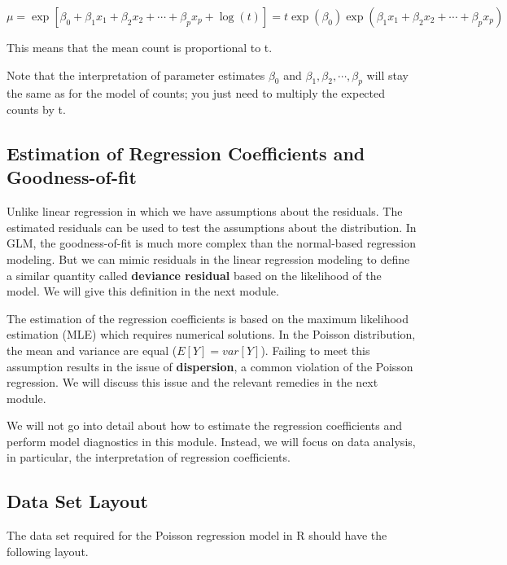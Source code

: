 \documentclass[
]{book}
\begin{document}
\[
\mu=\exp[\beta_0 + \beta_1 x_1 + \beta_2 x_2 + \cdots + \beta_p x_p+\log(t)]
= t\exp(\beta_0)\exp(\beta_1 x_1 + \beta_2 x_2 + \cdots + \beta_p x_p)
\]

This means that the mean count is proportional to t.

Note that the interpretation of parameter estimates \(\beta_0\) and \(\beta_1, \beta_2, \cdots, \beta_p\) will stay the same as for the model of counts; you just need to multiply the expected counts by t.

\hypertarget{estimation-of-regression-coefficients-and-goodness-of-fit}{%
\subsection{Estimation of Regression Coefficients and Goodness-of-fit}\label{estimation-of-regression-coefficients-and-goodness-of-fit}}

Unlike linear regression in which we have assumptions about the residuals. The estimated residuals can be used to test the assumptions about the distribution. In GLM, the goodness-of-fit is much more complex than the normal-based regression modeling. But we can mimic residuals in the linear regression modeling to define a similar quantity called \textbf{deviance residual} based on the likelihood of the model. We will give this definition in the next module.

The estimation of the regression coefficients is based on the maximum likelihood estimation (MLE) which requires numerical solutions. In the Poisson distribution, the mean and variance are equal (\(E[Y] = var[Y]\)). Failing to meet this assumption results in the issue of \textbf{dispersion}, a common violation of the Poisson regression. We will discuss this issue and the relevant remedies in the next module.

We will not go into detail about how to estimate the regression coefficients and perform model diagnostics in this module. Instead, we will focus on data analysis, in particular, the interpretation of regression coefficients.

\hypertarget{data-set-layout}{%
\subsection{Data Set Layout}\label{data-set-layout}}

The data set required for the Poisson regression model in R should have the following layout.
\end{document}
